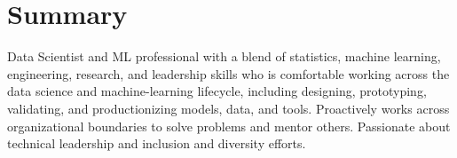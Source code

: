 \documentclass[print]{friggeri-cv} %
\begin{document}
{
  \section{Summary}
  Data Scientist and ML professional with a blend of statistics, machine
  learning, engineering, research, and leadership skills who is comfortable
  working across the data science and machine-learning lifecycle, including
  designing, prototyping, validating, and productionizing models, data, and
  tools. Proactively works across organizational boundaries to solve problems
  and mentor others. Passionate about technical leadership and inclusion and
  diversity efforts.
}
\iftoggle{cv}
{\section{Experience}
}
{\section{Selected Experience}
}
\end{document}
